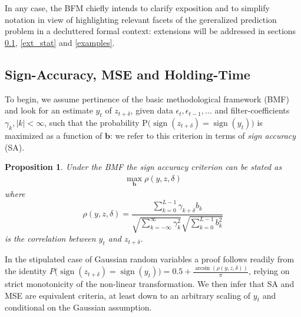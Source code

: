 \documentclass[a4paper]{article}
\newtheorem{Proposition}{Proposition}
\DeclareMathOperator{\sign}{sign}
\begin{document}
In any case, the BFM chiefly intends to clarify exposition and to simplify notation in view of highlighting relevant facets of the gereralized prediction problem in a decluttered formal context: extensions will be addressed in sections \ref{mse_sa_zc}, \ref{ext_stat} and \ref{examples}.  






\subsection{Sign-Accuracy, MSE and Holding-Time}\label{mse_sa_zc}

To begin, we assume pertinence of the basic methodological framework (BMF) and look for an estimate $y_t$ of $z_{t+\delta}$, given data $\epsilon_t,\epsilon_{t-1},...$ and filter-coefficients $\gamma_k, |k|<\infty$, such that the probability P$\Big(\sign(z_{t+\delta})=\sign(y_t)\Big)$ is maximized as a function of $\mathbf{b}$: we refer to this criterion in terms of \emph{sign accuracy} (SA).

\begin{Proposition}
Under the BMF the sign accuracy  criterion can be stated as
\begin{eqnarray}\label{opt_crit}
\max_{\mathbf{b}}\rho(y,z,\delta)
\end{eqnarray}
where 
\[
\rho(y,z,\delta)=\frac{\sum_{k=0}^{L-1}\gamma_{k+\delta}b_{k}}{\sqrt{\sum_{k=-\infty}^\infty \gamma_k^2}\sqrt{\sum_{k=0}^{L-1}b_k^2}}
\] 
is the correlation between $y_t$ and $z_{t+\delta}$. 
\end{Proposition}
In the stipulated case of Gaussian random variables a proof follows readily from the identity $P\Big(\sign(z_{t+\delta})=\sign(y_t)\Big)=0.5+\frac{\arcsin(\rho(y,z,\delta))}{\pi}$, relying on strict monotonicity of the non-linear transformation. %
We then infer that SA and MSE are equivalent criteria, at least down to an arbitrary scaling of $y_t$ and conditional on the Gaussian assumption.\\
\end{document}
